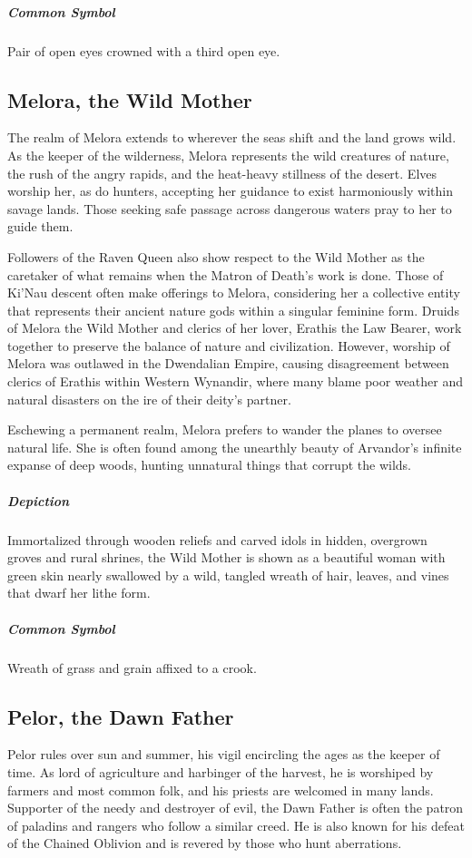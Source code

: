 \documentclass[letterpaper,twocolumn,openany,nodeprecatedcode]{dndbook}
\begin{document}
\subparagraph{Common Symbol}
Pair of open eyes crowned with a third open eye.

\subsection{Melora, the Wild Mother}

The realm of Melora extends to wherever the seas shift and the land grows wild. As the
keeper of the wilderness, Melora represents the wild creatures of nature, the rush of the
angry rapids, and the heat-heavy stillness of the desert. Elves worship her, as do hunters,
accepting her guidance to exist harmoniously within savage lands. Those seeking safe passage
across dangerous waters pray to her to guide them.

Followers of the Raven Queen also show respect to the Wild Mother as the caretaker of
what remains when the Matron of Death’s work is done. Those of Ki’Nau descent often make
offerings to Melora, considering her a collective entity that represents their ancient nature
gods within a singular feminine form. Druids of Melora the Wild Mother and clerics of her
lover, Erathis the Law Bearer, work together to preserve the balance of nature and
civilization. However, worship of Melora was outlawed in the Dwendalian Empire, causing
disagreement between clerics of Erathis within Western Wynandir, where many blame poor
weather and natural disasters on the ire of their deity’s partner.

Eschewing a permanent realm, Melora prefers to wander the planes to oversee natural life.
She is often found among the unearthly beauty of Arvandor’s infinite expanse of deep woods,
hunting unnatural things that corrupt the wilds.

\subparagraph{Depiction}
Immortalized through wooden reliefs and carved idols in hidden, overgrown groves and rural
shrines, the Wild Mother is shown as a beautiful woman with green skin nearly swallowed by
a wild, tangled wreath of hair, leaves, and vines that dwarf her lithe form.

\subparagraph{Common Symbol}
Wreath of grass and grain affixed to a crook.

\subsection{Pelor, the Dawn Father}

Pelor rules over sun and summer, his vigil encircling the ages as the keeper of time. As
lord of agriculture and harbinger of the harvest, he is worshiped by farmers and most common
folk, and his priests are welcomed in many lands. Supporter of the needy and destroyer of
evil, the Dawn Father is often the patron of paladins and rangers who follow a similar creed.
He is also known for his defeat of the Chained Oblivion and is revered by those who
hunt aberrations.
\end{document}
